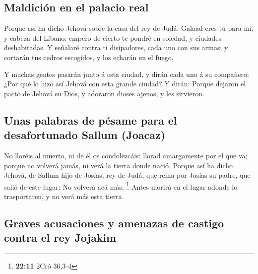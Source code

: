 \hypertarget{maldiciuxf3n-en-el-palacio-real}{%
\subsection{Maldición en el palacio
real}\label{maldiciuxf3n-en-el-palacio-real}}

 Porque así ha dicho Jehová sobre la casa del rey de Judá:
Galaad eres tú para mí, y cabeza del Líbano: empero de cierto te pondré
en soledad, y ciudades deshabitadas.  Y señalaré contra ti
disipadores, cada uno con sus armas; y cortarán tus cedros escogidos, y
los echarán en el fuego.

 Y muchas gentes pasarán junto á esta ciudad, y dirán cada
uno á su compañero: ¿Por qué lo hizo así Jehová con esta grande ciudad?
 Y dirán: Porque dejaron el pacto de Jehová su Dios, y
adoraron dioses ajenos, y les sirvieron.

\hypertarget{unas-palabras-de-puxe9same-para-el-desafortunado-sallum-joacaz}{%
\subsection{Unas palabras de pésame para el desafortunado Sallum
(Joacaz)}\label{unas-palabras-de-puxe9same-para-el-desafortunado-sallum-joacaz}}

 No lloréis al muerto, ni de él os condolezcáis: llorad
amargamente por el que va; porque no volverá jamás, ni verá la tierra
donde nació.  Porque así ha dicho Jehová, de Sallum hijo de
Josías, rey de Judá, que reina por Josías su padre, que salió de este
lugar: No volverá acá más; \footnote{\textbf{22:11} 2Cró 36,3-4}
 Antes morirá en el lugar adonde lo trasportaren, y no verá
más esta tierra.

\hypertarget{graves-acusaciones-y-amenazas-de-castigo-contra-el-rey-jojakim}{%
\subsection{Graves acusaciones y amenazas de castigo contra el rey
Jojakim}\label{graves-acusaciones-y-amenazas-de-castigo-contra-el-rey-jojakim}}

